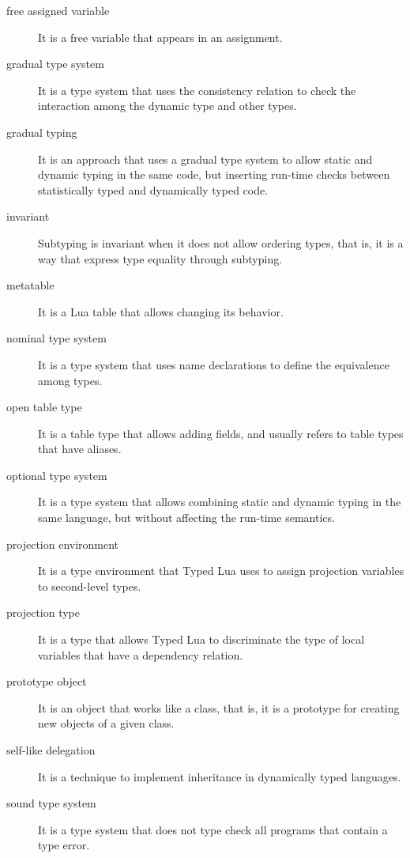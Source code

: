 \begin{description}
\item[free assigned variable] It is a free variable that appears in an assignment.

\item[gradual type system] It is a type system that uses the consistency relation to check the interaction
among the dynamic type and other types.

\item[gradual typing] It is an approach that uses a gradual type system to allow static and dynamic
typing in the same code, but inserting run-time checks between statistically
typed and dynamically typed code.

\item[invariant] Subtyping is invariant when it does not allow ordering types, that is,
it is a way that express type equality through subtyping.

\item[metatable] It is a Lua table that allows changing its behavior.

\item[nominal type system] It is a type system that uses name declarations to define the equivalence among types.

\item[open table type] It is a table type that allows adding fields, and usually refers to table types that
have aliases.

\item[optional type system] It is a type system that allows combining static and dynamic typing in the same
language, but without affecting the run-time semantics.

\item[projection environment] It is a type environment that Typed Lua uses to assign projection variables to
second-level types.

\item[projection type] It is a type that allows Typed Lua to discriminate the type of local variables
that have a dependency relation.

\item[prototype object] It is an object that works like a class, that is, it is a prototype for creating
new objects of a given class.

\item[self-like delegation] It is a technique to implement inheritance in dynamically typed languages.

\item[sound type system] It is a type system that does not type check all programs that contain a type error.


\end{description}
